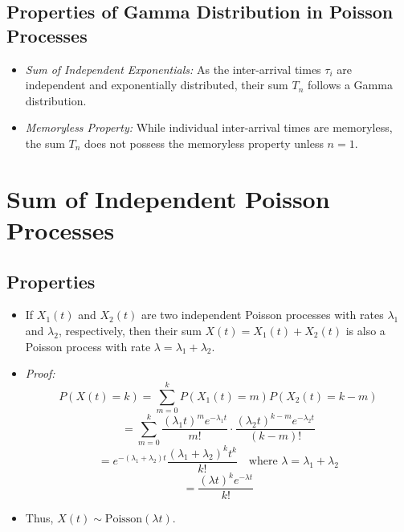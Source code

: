 \documentclass[12pt]{article}
\begin{document}
\subsection{Properties of Gamma Distribution in Poisson Processes}
\begin{itemize}
    \item \textit{Sum of Independent Exponentials:} As the inter-arrival times \( \tau_i \) are independent and exponentially distributed, their sum \( T_n \) follows a Gamma distribution.
    \item \textit{Memoryless Property:} While individual inter-arrival times are memoryless, the sum \( T_n \) does not possess the memoryless property unless \( n = 1 \).
\end{itemize}

\section{Sum of Independent Poisson Processes}

\subsection{Properties}
\begin{itemize}
    \item If \( X_1(t) \) and \( X_2(t) \) are two independent Poisson processes with rates \( \lambda_1 \) and \( \lambda_2 \), respectively, then their sum \( X(t) = X_1(t) + X_2(t) \) is also a Poisson process with rate \( \lambda = \lambda_1 + \lambda_2 \).
    \item \textit{Proof:}
    \[
    P(X(t) = k) = \sum_{m=0}^{k} P(X_1(t) = m) P(X_2(t) = k - m)
    \]
    \[
    = \sum_{m=0}^{k} \frac{(\lambda_1 t)^m e^{-\lambda_1 t}}{m!} \cdot \frac{(\lambda_2 t)^{k - m} e^{-\lambda_2 t}}{(k - m)!}
    \]
    \[
    = e^{-(\lambda_1 + \lambda_2)t} \frac{(\lambda_1 + \lambda_2)^k t^k}{k!} \quad \text{where } \lambda = \lambda_1 + \lambda_2
    \]
    \[
    = \frac{(\lambda t)^k e^{-\lambda t}}{k!}
    \]
    \item Thus, \( X(t) \sim \text{Poisson}(\lambda t) \).
\end{itemize}
\end{document}
